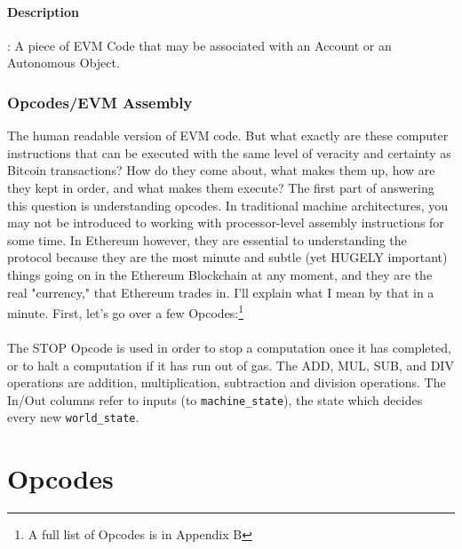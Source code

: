 \documentclass[10pt,a4paper,leqno,bibliography=totoc]{scrartcl}
\newenvironment{alphafootnotes}
{\par\edef\savedfootnotenumber{\number\value{footnote}}
\renewcommand{\thefootnote}{\alph{footnote}}
\setcounter{footnote}{0}}
{\par\setcounter{footnote}{\savedfootnotenumber}}
\begin{document}
\begin{alphafootnotes}
\begin{multicols*}{2}
				\paragraph{Description}: A piece of EVM Code that may be associated with an Account or an Autonomous Object. 

			\subsubsection{Opcodes/EVM Assembly}
		The human readable version of EVM code. But what exactly are these computer instructions that can be executed with the same level of veracity and certainty as Bitcoin transactions? How do they come about, what makes them up, how are they kept in order, and what makes them execute? The first part of answering this question is understanding opcodes. In traditional machine architectures, you may not be introduced to working with processor-level assembly instructions for some time. In Ethereum however, they are essential to understanding the protocol because they are the most minute and subtle (yet HUGELY important) things going on in the Ethereum Blockchain at any moment, and they are the real "currency," that Ethereum trades in. I'll explain what I mean by that in a minute. First, let's go over a few Opcodes:\footnote{A full list of Opcodes is in Appendix B} \\


				\paragraph{}The STOP Opcode is used in order to stop a computation once it has completed, or to halt a computation if it has run out of gas. The ADD, MUL, SUB, and DIV operations are addition, multiplication, subtraction and division operations. The In/Out columns refer to inputs (to \texttt{machine\_state}), the state which decides every new \texttt{world\_state}. 

\end{multicols*}

\appendix

\section{Opcodes}

\end{alphafootnotes}
\end{document}
